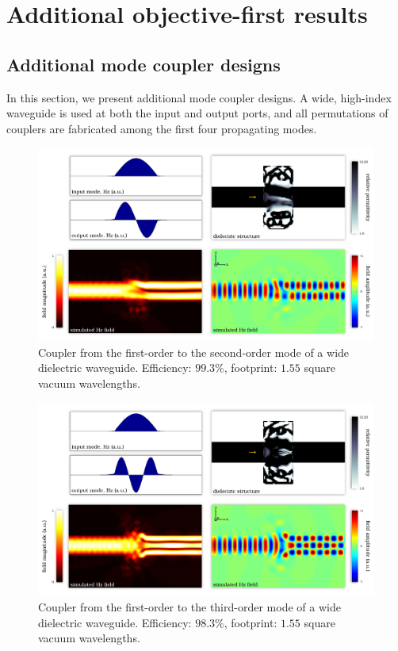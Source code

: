 \chapter{Additional objective-first results}\label{ob-1 additional}
\section{Additional mode coupler designs}
In this section, we present additional mode coupler designs.
A wide, high-index waveguide is used at both the input and output ports,
    and all permutations of couplers are fabricated among
    the first four propagating modes.
\begin{figure}[h!]
    \centering
    \includegraphics[width=\textwidth]{p3/6}
    \caption{
        Coupler from the first-order to the second-order mode 
            of a wide dielectric waveguide.
        Efficiency: $99.3\%$,
        footprint: $1.55$ square vacuum wavelengths.
        }
\end{figure}
\begin{figure}[h!]
    \centering
    \includegraphics[width=\textwidth]{p3/7}
    \caption{
        Coupler from the first-order to the third-order mode 
            of a wide dielectric waveguide.
        Efficiency: $98.3\%$,
        footprint: $1.55$ square vacuum wavelengths.
        }
\end{figure}

